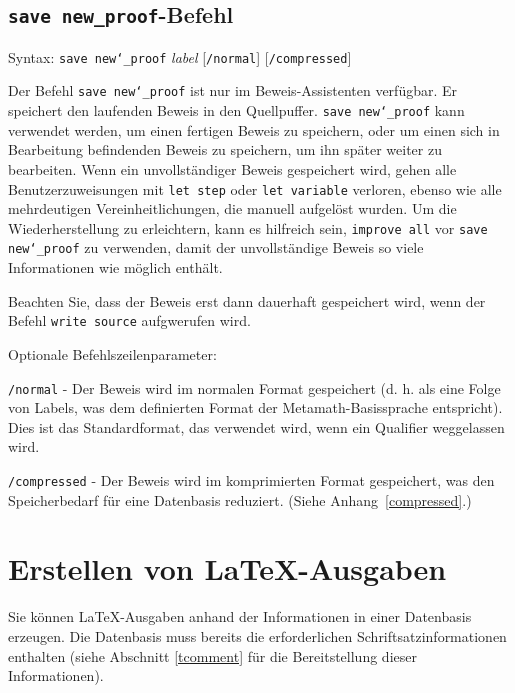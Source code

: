 \subsection{\texttt{save new\_proof}-Befehl}

Syntax:  \texttt{save new{\char`\_}proof} {\em label} [\texttt{/normal}]
   [\texttt{/compressed}]

Der Befehl \texttt{save new{\char`\_}proof} ist nur im Beweis-Assistenten verfügbar.  Er speichert den laufenden Beweis in den Quellpuffer.  \texttt{save new{\char`\_}proof} kann verwendet werden, um einen fertigen Beweis zu speichern, oder um einen sich in Bearbeitung befindenden Beweis zu speichern, um ihn später weiter zu bearbeiten.  Wenn ein unvollständiger Beweis gespeichert wird, gehen alle Benutzerzuweisungen mit \texttt{let step} oder \texttt{let variable} verloren, ebenso wie alle mehrdeutigen Vereinheitlichungen, die manuell aufgelöst wurden. Um die Wiederherstellung zu erleichtern, kann es hilfreich sein, \texttt{improve all} vor \texttt{save new{\char`\_}proof} zu verwenden, damit der unvollständige Beweis so viele Informationen wie möglich enthält.

Beachten Sie, dass der Beweis erst dann dauerhaft gespeichert wird, wenn der Befehl \texttt{write source} aufgwerufen wird.

Optionale Befehlszeilenparameter:

    \texttt{/normal} - Der Beweis wird im normalen Format gespeichert (d. h. als eine Folge von Labels, was dem definierten Format der Metamath-Basissprache entspricht).  Dies ist das Standardformat, das verwendet wird, wenn ein Qualifier weggelassen wird.

    \texttt{/compressed} - Der Beweis wird im komprimierten Format gespeichert, was den Speicherbedarf für eine Datenbasis reduziert. (Siehe Anhang~\ref{compressed}.)


\section{Erstellen von \LaTeX-Ausgaben}\label{texout}

Sie können \LaTeX-Ausgaben anhand der Informationen in einer Datenbasis erzeugen. Die Datenbasis muss bereits die erforderlichen Schriftsatzinformationen enthalten (siehe Abschnitt \ref{tcomment} für die Bereitstellung dieser Informationen).

